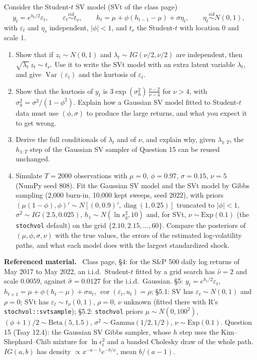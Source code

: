 \documentclass[11pt,a4paper]{article}
\newenvironment{refmat}{\par\smallskip\noindent\begin{minipage}{\linewidth}\small\textbf{Referenced material.}~}{\end{minipage}\par\smallskip}
\begin{document}
\noindent Consider the Student-$t$ SV model (SVt of the class page)
\[ y_t=e^{h_t/2}\varepsilon_t,\qquad \varepsilon_t\overset{iid}{\sim}t_\nu,\qquad h_t=\mu+\phi(h_{t-1}-\mu)+\sigma\eta_t,\qquad \eta_t\overset{iid}{\sim}N(0,1), \]
with $\varepsilon_t$ and $\eta_s$ independent, $|\phi|<1$, and $t_\nu$ the Student-$t$ with location 0 and scale 1.
\begin{enumerate}[label=(\alph*)]
\item Show that if $z_t\sim N(0,1)$ and $\lambda_t\sim IG(\nu/2,\nu/2)$ are independent, then $\sqrt{\lambda_t}\,z_t\sim t_\nu$.
Use it to write the SVt model with an extra latent variable $\lambda_t$, and give $\operatorname{Var}(\varepsilon_t)$ and the kurtosis of $\varepsilon_t$.
\item Show that the kurtosis of $y_t$ is $3\exp(\sigma_h^2)\,\frac{\nu-2}{\nu-4}$ for $\nu>4$, with
$\sigma_h^2=\sigma^2/(1-\phi^2)$. Explain how a Gaussian SV model fitted to Student-$t$ data must use $(\phi,\sigma)$ to produce
the large returns, and what you expect it to get wrong.
\item Derive the full conditionals of $\lambda_t$ and of $\nu$, and explain why, given $\lambda_{1:T}$, the $h_{1:T}$ step
of the Gaussian SV sampler of Question 15 can be reused unchanged.
\item Simulate $T=2000$ observations with $\mu=0$, $\phi=0.97$, $\sigma=0.15$, $\nu=5$ (NumPy seed 808). Fit the
Gaussian SV model and the SVt model by Gibbs sampling (2,000 burn-in, 10,000 kept sweeps, seed 2022), with priors
$(\mu(1-\phi),\phi)'\sim N[(0,0.9)',\operatorname{diag}(1,0.25)]$ truncated to $|\phi|<1$, $\sigma^2\sim IG(2.5,0.025)$,
$h_1\sim N(\ln s_y^2,10)$ and, for SVt, $\nu\sim\text{Exp}(0.1)$ (the \texttt{stochvol} default) on the grid
$\{2.10,2.15,\dots,60\}$. Compare the posteriors of $(\mu,\phi,\sigma,\nu)$ with the true values, the errors of the
estimated log-volatility paths, and what each model does with the largest standardized shock.
\end{enumerate}
\begin{refmat}
Class page, \S4: for the S\&P 500 daily log returns of May 2017 to May 2022, an i.i.d.\ Student-$t$
fitted by a grid search has $\hat\nu=2$ and scale $0.0059$, against $\hat\sigma=0.0127$ for the i.i.d.\ Gaussian.
\S5: $y_t=e^{h_t/2}\varepsilon_t$, $h_{t+1}=\mu+\phi(h_t-\mu)+\sigma u_t$, $\operatorname{cor}(\varepsilon_t,u_t)=\rho$;
\S5.1: SV has $\varepsilon_t\sim N(0,1)$ and $\rho=0$; SVt has $\varepsilon_t\sim t_\nu(0,1)$, $\rho=0$, $\nu$ unknown
(fitted there with R's \texttt{stochvol::svtsample}); \S5.2: \texttt{stochvol} priors $\mu\sim N(0,100^2)$,
$(\phi+1)/2\sim\text{Beta}(5,1.5)$, $\sigma^2\sim\text{Gamma}(1/2,1/2)$, $\nu\sim\text{Exp}(0.1)$. Question 15 (Tsay 12.4):
the Gaussian SV Gibbs sampler, whose $h$ step uses the Kim--Shephard--Chib mixture for $\ln\epsilon_t^2$ and a
banded Cholesky draw of the whole path. $IG(a,b)$ has density $\propto x^{-a-1}e^{-b/x}$, mean $b/(a-1)$.
\end{refmat}
\end{document}
